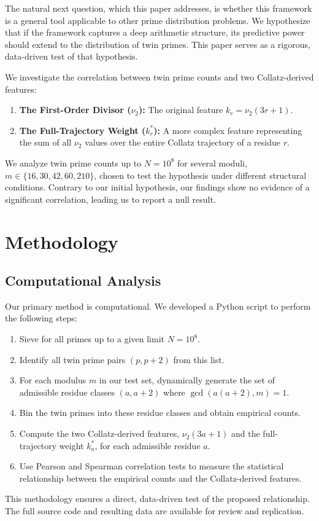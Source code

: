 \documentclass[12pt]{article}
\begin{document}
	The natural next question, which this paper addresses, is whether this framework is a general tool applicable to other prime distribution problems. We hypothesize that if the framework captures a deep arithmetic structure, its predictive power should extend to the distribution of twin primes. This paper serves as a rigorous, data-driven test of that hypothesis.
	
	We investigate the correlation between twin prime counts and two Collatz-derived features:
	\begin{enumerate}
		\item \textbf{The First-Order Divisor ($\nu_2$):} The original feature $k_r = \nu_2(3r+1)$.
		\item \textbf{The Full-Trajectory Weight ($k_r^*$):} A more complex feature representing the sum of all $\nu_2$ values over the entire Collatz trajectory of a residue $r$.
	\end{enumerate}
	We analyze twin prime counts up to $N = 10^8$ for several moduli, $m \in \{16, 30, 42, 60, 210\}$, chosen to test the hypothesis under different structural conditions. Contrary to our initial hypothesis, our findings show no evidence of a significant correlation, leading us to report a null result.
	
	\section{Methodology}
	\subsection{Computational Analysis}
	Our primary method is computational. We developed a Python script to perform the following steps:
	\begin{enumerate}
		\item Sieve for all primes up to a given limit $N = 10^8$.
		\item Identify all twin prime pairs $(p, p+2)$ from this list.
		\item For each modulus $m$ in our test set, dynamically generate the set of admissible residue classes $(a, a+2)$ where $\gcd(a(a+2), m) = 1$.
		\item Bin the twin primes into these residue classes and obtain empirical counts.
		\item Compute the two Collatz-derived features, $\nu_2(3a+1)$ and the full-trajectory weight $k_a^*$, for each admissible residue $a$.
		\item Use Pearson and Spearman correlation tests to measure the statistical relationship between the empirical counts and the Collatz-derived features.
	\end{enumerate}
	This methodology ensures a direct, data-driven test of the proposed relationship. The full source code and resulting data are available for review and replication.
	
\end{document}
